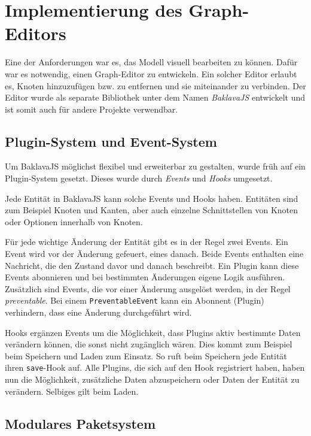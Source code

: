 
\chapter{Implementierung des Graph-Editors}
\label{sec:grapheditor}

Eine der Anforderungen war es, das Modell visuell bearbeiten zu können. Dafür war es notwendig, einen Graph-Editor zu entwickeln. Ein solcher Editor erlaubt es, Knoten hinzuzufügen bzw. zu entfernen und sie miteinander zu verbinden. Der Editor wurde als separate Bibliothek unter dem Namen \textit{BaklavaJS} entwickelt und ist somit auch für andere Projekte verwendbar.


\section{Plugin-System und Event-System}

Um BaklavaJS möglichst flexibel und erweiterbar zu gestalten, wurde früh auf ein Plugin-System gesetzt. Dieses wurde durch \textit{Events} und \textit{Hooks} umgesetzt.

Jede Entität in BaklavaJS kann solche Events und Hooks haben. Entitäten sind zum Beispiel Knoten und Kanten, aber auch einzelne Schnittstellen von Knoten oder Optionen innerhalb von Knoten.

Für jede wichtige Änderung der Entität gibt es in der Regel zwei Events. Ein Event wird vor der Änderung gefeuert, eines danach. Beide Events enthalten eine Nachricht, die den Zustand davor und danach beschreibt. Ein Plugin kann diese Events abonnieren und bei bestimmten Änderungen eigene Logik ausführen. Zusätzlich sind Events, die vor einer Änderung ausgelöst werden, in der Regel \textit{preventable}. Bei einem \texttt{PreventableEvent} kann ein Abonnent (Plugin) verhindern, dass eine Änderung durchgeführt wird.

Hooks ergänzen Events um die Möglichkeit, dass Plugins aktiv bestimmte Daten verändern können, die sonst nicht zugänglich wären. Dies kommt zum Beispiel beim Speichern und Laden zum Einsatz. So ruft beim Speichern jede Entität ihren \texttt{save}-Hook auf. Alle Plugins, die sich auf den Hook registriert haben, haben nun die Möglichkeit, zusätzliche Daten abzuspeichern oder Daten der Entität zu verändern. Selbiges gilt beim Laden.

\section{Modulares Paketsystem}

